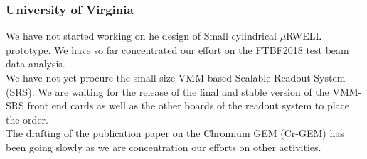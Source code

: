 \subsubsection{University of Virginia}
We have not started working on he design of Small cylindrical $\mu$RWELL prototype. We have so far concentrated our effort on the FTBF2018 test beam data analysis.
\\ We have not yet procure the small size VMM-based Scalable Readout System (SRS). We are waiting for the release of the final and stable  version of the VMM-SRS front end cards as well as the other boards of the readout system to place the order.
\\ The drafting of the publication paper on the Chromium GEM (Cr-GEM)  has been going slowly as we are concentration our efforts on other activities.